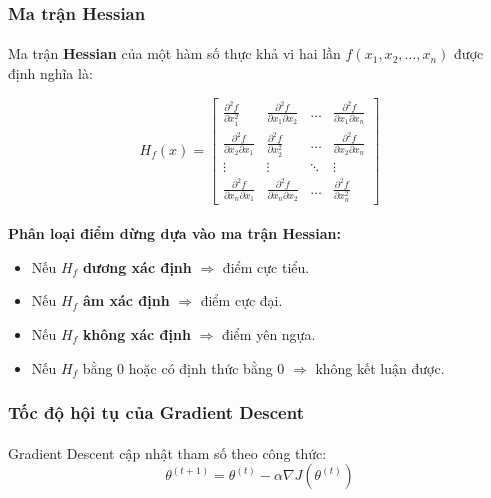 \subsubsection{Ma trận Hessian}

\paragraph{}{Ma trận \textbf{Hessian} của một hàm số thực khả vi hai lần \( f(x_1, x_2, \dots, x_n) \) được định nghĩa là:}

\[
H_f(x) =
\begin{bmatrix}
\frac{\partial^2 f}{\partial x_1^2} & \frac{\partial^2 f}{\partial x_1 \partial x_2} & \dots & \frac{\partial^2 f}{\partial x_1 \partial x_n} \\
\frac{\partial^2 f}{\partial x_2 \partial x_1} & \frac{\partial^2 f}{\partial x_2^2} & \dots & \frac{\partial^2 f}{\partial x_2 \partial x_n} \\
\vdots & \vdots & \ddots & \vdots \\
\frac{\partial^2 f}{\partial x_n \partial x_1} & \frac{\partial^2 f}{\partial x_n \partial x_2} & \dots & \frac{\partial^2 f}{\partial x_n^2}
\end{bmatrix}
\]

\paragraph{}{\textbf{Phân loại điểm dừng dựa vào ma trận Hessian:}}
\begin{itemize}
    \item Nếu \( H_f \) \textbf{dương xác định} \( \Rightarrow \) điểm cực tiểu.
    \item Nếu \( H_f \) \textbf{âm xác định} \( \Rightarrow \) điểm cực đại.
    \item Nếu \( H_f \) \textbf{không xác định} \( \Rightarrow \) điểm yên ngựa.
    \item Nếu \( H_f \) bằng 0 hoặc có định thức bằng 0 \( \Rightarrow \) không kết luận được.
\end{itemize}
\subsubsection{Tốc độ hội tụ của Gradient Descent}
\label{label:toc do hoi tu}

\paragraph{}{Gradient Descent cập nhật tham số theo công thức:}
\[
\theta^{(t+1)} = \theta^{(t)} - \alpha \nabla J(\theta^{(t)})
\]
